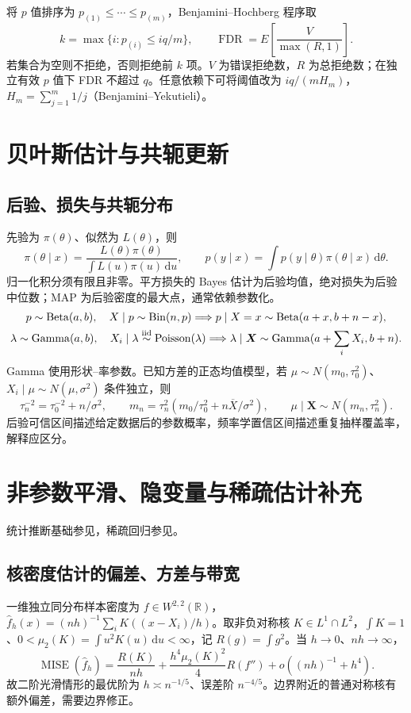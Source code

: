 \documentclass[../main.tex]{subfiles}
\begin{document}
将 $p$ 值排序为 $p_{(1)}\le\cdots\le p_{(m)}$，Benjamini--Hochberg 程序取
\[
k=\max\{i:p_{(i)}\le iq/m\},\qquad
\operatorname{FDR}=E\!\left[\frac{V}{\max(R,1)}\right].
\]
若集合为空则不拒绝，否则拒绝前 $k$ 项。$V$ 为错误拒绝数，$R$ 为总拒绝数；在独立有效 $p$ 值下 FDR 不超过 $q$。任意依赖下可将阈值改为 $iq/(mH_m)$，$H_m=\sum_{j=1}^m1/j$（Benjamini--Yekutieli）。

\section{贝叶斯估计与共轭更新}
\subsection{后验、损失与共轭分布}
先验为 $\pi(\theta)$、似然为 $L(\theta)$，则
\[
\pi(\theta\mid x)=\frac{L(\theta)\pi(\theta)}{\int L(u)\pi(u)\,\mathrm du},\qquad
p(y\mid x)=\int p(y\mid\theta)\pi(\theta\mid x)\,\mathrm d\theta.
\]
归一化积分须有限且非零。平方损失的 Bayes 估计为后验均值，绝对损失为后验中位数；MAP 为后验密度的最大点，通常依赖参数化。
\begin{gather*}
p\sim\operatorname{Beta}(a,b),\quad X\mid p\sim\operatorname{Bin}(n,p)
\Longrightarrow p\mid X=x\sim\operatorname{Beta}(a+x,b+n-x),\\
\lambda\sim\operatorname{Gamma}(a,b),\quad X_i\mid\lambda\overset{\rm iid}\sim\operatorname{Poisson}(\lambda)
\Longrightarrow\lambda\mid\bm X\sim\operatorname{Gamma}(a+\sum_iX_i,b+n).
\end{gather*}
Gamma 使用形状--率参数。已知方差的正态均值模型，若 $\mu\sim N(m_0,\tau_0^2)$、$X_i\mid\mu\sim N(\mu,\sigma^2)$ 条件独立，则
\[
\tau_n^{-2}=\tau_0^{-2}+n/\sigma^2,\qquad
m_n=\tau_n^2(m_0/\tau_0^2+n\overline X/\sigma^2),\qquad
\mu\mid\bm X\sim N(m_n,\tau_n^2).
\]
后验可信区间描述给定数据后的参数概率，频率学置信区间描述重复抽样覆盖率，解释应区分。

\section{非参数平滑、隐变量与稀疏估计补充}
统计推断基础参见\cite{wasserman}，稀疏回归参见\cite{sparsity}。
\subsection{核密度估计的偏差、方差与带宽}
一维独立同分布样本密度为 $f\in W^{2,2}(\mathbb R)$，$\widehat f_h(x)=(nh)^{-1}\sum_iK((x-X_i)/h)$。取非负对称核 $K\in L^1\cap L^2$，$\int K=1$、$0<\mu_2(K)=\int u^2K(u)\,\mathrm du<\infty$，记 $R(g)=\int g^2$。当 $h\to0$、$nh\to\infty$，
\[
\operatorname{MISE}(\widehat f_h)=\frac{R(K)}{nh}
+\frac{h^4\mu_2(K)^2}{4}R(f'')+o((nh)^{-1}+h^4).
\]
故二阶光滑情形的最优阶为 $h\asymp n^{-1/5}$、误差阶 $n^{-4/5}$。边界附近的普通对称核有额外偏差，需要边界修正。
\end{document}
